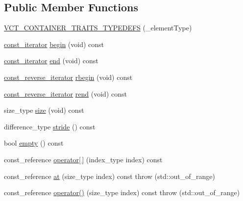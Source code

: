 \subsection*{Public Member Functions}
\begin{DoxyCompactItemize}
\item 
\hyperlink{classvct_dynamic_const_vector_base_a63aca3a525a4e0586f6d2605a043da30}{V\+C\+T\+\_\+\+C\+O\+N\+T\+A\+I\+N\+E\+R\+\_\+\+T\+R\+A\+I\+T\+S\+\_\+\+T\+Y\+P\+E\+D\+E\+F\+S} (\+\_\+element\+Type)
\item 
\hyperlink{classvct_dynamic_const_vector_base_ad04d1e54698ac5e244d15dfacd0e603c}{const\+\_\+iterator} \hyperlink{classvct_dynamic_const_vector_base_a381043489a635413066ab6ac56a69992}{begin} (void) const 
\item 
\hyperlink{classvct_dynamic_const_vector_base_ad04d1e54698ac5e244d15dfacd0e603c}{const\+\_\+iterator} \hyperlink{classvct_dynamic_const_vector_base_aeaa7a44c2f37bf702e558ca3c4dae8b2}{end} (void) const 
\item 
\hyperlink{classvct_dynamic_const_vector_base_aadfcc99550b376238b6c793c17d19ca5}{const\+\_\+reverse\+\_\+iterator} \hyperlink{classvct_dynamic_const_vector_base_acf50b72382ed9d6f5ae52de5871205ea}{rbegin} (void) const 
\item 
\hyperlink{classvct_dynamic_const_vector_base_aadfcc99550b376238b6c793c17d19ca5}{const\+\_\+reverse\+\_\+iterator} \hyperlink{classvct_dynamic_const_vector_base_ac572c37dbea0db58f5a88d8ac9e16dca}{rend} (void) const 
\item 
size\+\_\+type \hyperlink{classvct_dynamic_const_vector_base_a79950d8cced7fd4e790d9ac2ca1c43a7}{size} (void) const 
\item 
difference\+\_\+type \hyperlink{classvct_dynamic_const_vector_base_af0440ce847480b353e9f85edccc03158}{stride} () const 
\item 
bool \hyperlink{classvct_dynamic_const_vector_base_a79da2d2783768d927f1181e2d593fba6}{empty} () const 
\item 
const\+\_\+reference \hyperlink{classvct_dynamic_const_vector_base_a17cef202525ee1a77c004d1f53876777}{operator\mbox{[}$\,$\mbox{]}} (index\+\_\+type index) const 
\item 
const\+\_\+reference \hyperlink{classvct_dynamic_const_vector_base_a80200034ab8246259be4dfb8decc7e50}{at} (size\+\_\+type index) const   throw (std\+::out\+\_\+of\+\_\+range)
\item 
const\+\_\+reference \hyperlink{classvct_dynamic_const_vector_base_a0bc74c2f59ce479b9ea2a2175afbc1cd}{operator()} (size\+\_\+type index) const   throw (std\+::out\+\_\+of\+\_\+range)

\end{DoxyCompactItemize}

